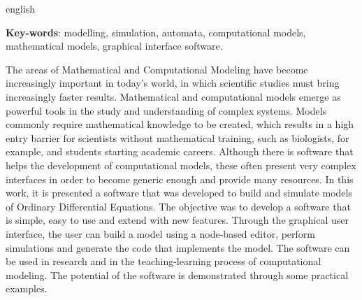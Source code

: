 \begin{resumo}[Abstract]
	\begin{otherlanguage*}{english}
    
    
		\vspace{\onelineskip}
		
		\noindent 
		\textbf{Key-words}: modelling, simulation, automata, computational models, mathematical models, graphical interface software.
		
		The areas of Mathematical and Computational Modeling have become increasingly important in today's world, in which scientific studies must bring increasingly faster results. Mathematical and computational models emerge as powerful tools in the study and understanding of complex systems. Models commonly require mathematical knowledge to be created, which results in a high entry barrier for scientists without mathematical training, such as biologists, for example, and students starting academic careers. Although there is software that helps the development of computational models, these often present very complex interfaces in order to become generic enough and provide many resources. In this work, it is presented a software that was developed to build and simulate models of Ordinary Differential Equations. The objective was to develop a software that is simple, easy to use and extend with new features. Through the graphical user interface, the user can build a model using a node-based editor, perform simulations and generate the code that implements the model. The software can be used in research and in the teaching-learning process of computational modeling. The potential of the software is demonstrated through some practical examples.
	\end{otherlanguage*}
\end{resumo}
